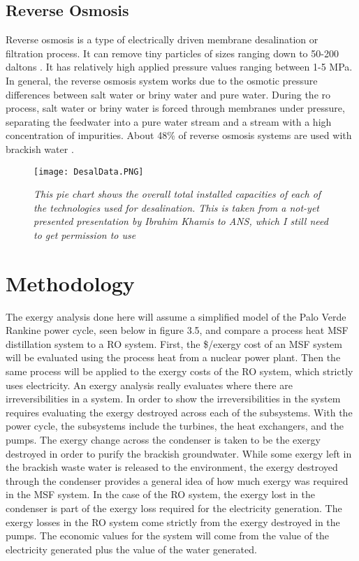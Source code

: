 \subsection{Reverse Osmosis}

Reverse osmosis is a type of electrically driven membrane desalination or filtration process. It can remove tiny particles of sizes ranging down to 50-200 daltons \cite{Pangarkar2011}. It has relatively high applied pressure values ranging between 1-5 MPa. In general, the reverse osmosis system works due to the osmotic pressure differences between salt water or briny water and pure water. During the \ac{ro} process, salt water or briny water is forced through membranes under pressure, separating the feedwater into a pure water stream and a stream with a high concentration of impurities.  About 48\% of reverse osmosis systems are used with brackish water \cite{Pangarkar2011}.

\begin{figure*}[h!]
\centering
\label{DesalData}
\texttt{[image: DesalData.PNG]}
\caption{\small \sl This pie chart shows the overall total installed capacities of each of the technologies used for desalination.  This is taken from a not-yet presented presentation by Ibrahim Khamis to ANS, which I still need to get permission to use}
\centering
\end{figure*}

\section{Methodology}
 The exergy analysis done here will assume a simplified model of the Palo Verde Rankine power cycle, seen below in figure 3.5, and compare a process heat MSF distillation system to a RO system.  First, the  \$/exergy cost of an MSF system will be evaluated using the process heat from a nuclear power plant. Then the same process will be applied to the exergy costs of the RO system, which strictly uses electricity. An exergy analysis really evaluates where there are irreversibilities in a system. In order to show the irreversibilities in the system requires evaluating the exergy destroyed across each of the subsystems.  With the power cycle, the subsystems include the turbines, the heat exchangers, and the pumps.  The exergy change across the condenser is taken to be the exergy destroyed in order to purify the brackish groundwater. While some exergy left in the brackish waste water is released to the environment, the exergy destroyed through the condenser provides a general idea of how much exergy was required in the MSF system. In the case of the RO system, the exergy lost in the condenser is part of the exergy loss required for the electricity generation. The exergy losses in the RO system come strictly from the exergy destroyed in the pumps. The economic values for the system will come from the value of the electricity generated plus the value of the water generated.  


